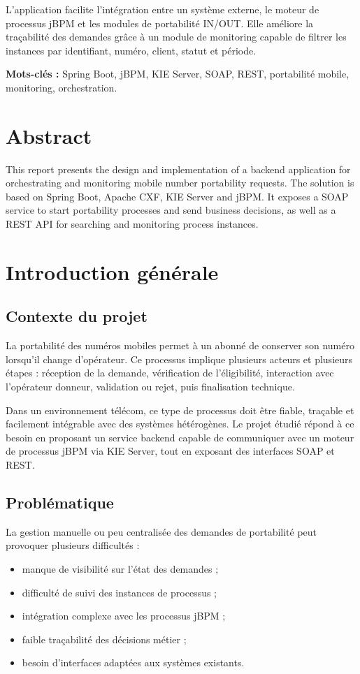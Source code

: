 \documentclass[12pt,a4paper]{report}
\begin{document}
L'application facilite l'intégration entre un système externe, le moteur de processus jBPM et les modules de portabilité IN/OUT. Elle améliore la traçabilité des demandes grâce à un module de monitoring capable de filtrer les instances par identifiant, numéro, client, statut et période.

\textbf{Mots-clés :} Spring Boot, jBPM, KIE Server, SOAP, REST, portabilité mobile, monitoring, orchestration.

\chapter*{Abstract}
This report presents the design and implementation of a backend application for orchestrating and monitoring mobile number portability requests. The solution is based on Spring Boot, Apache CXF, KIE Server and jBPM. It exposes a SOAP service to start portability processes and send business decisions, as well as a REST API for searching and monitoring process instances.

\tableofcontents
\listoffigures
\listoftables

\clearpage
{}

\chapter{Introduction générale}
\section{Contexte du projet}
La portabilité des numéros mobiles permet à un abonné de conserver son numéro lorsqu'il change d'opérateur. Ce processus implique plusieurs acteurs et plusieurs étapes : réception de la demande, vérification de l'éligibilité, interaction avec l'opérateur donneur, validation ou rejet, puis finalisation technique.

Dans un environnement télécom, ce type de processus doit être fiable, traçable et facilement intégrable avec des systèmes hétérogènes. Le projet étudié répond à ce besoin en proposant un service backend capable de communiquer avec un moteur de processus jBPM via KIE Server, tout en exposant des interfaces SOAP et REST.

\section{Problématique}
La gestion manuelle ou peu centralisée des demandes de portabilité peut provoquer plusieurs difficultés :
\begin{itemize}
    \item manque de visibilité sur l'état des demandes ;
    \item difficulté de suivi des instances de processus ;
    \item intégration complexe avec les processus jBPM ;
    \item faible traçabilité des décisions métier ;
    \item besoin d'interfaces adaptées aux systèmes existants.
\end{itemize}
\end{document}
